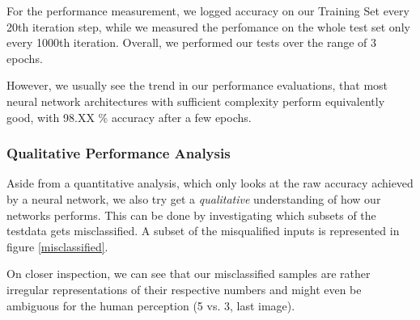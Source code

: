 \documentclass{article}
\begin{document}
For the performance measurement, we logged accuracy on our Training Set every 20th iteration step, while we measured the perfomance on the whole test set only every 1000th iteration. Overall, we performed our tests over the range of 3 epochs. 

However, we usually see the trend in our performance evaluations, that most neural network architectures with sufficient complexity perform equivalently good, with 98.XX \% accuracy after a few epochs.

\subsubsection{Qualitative Performance Analysis}

Aside from a quantitative analysis, which only looks at the raw accuracy achieved by a neural network, we also try get a \textit{qualitative} understanding of how our networks performs. This can be done by investigating which subsets of the testdata gets misclassified. A subset of the misqualified inputs is represented in figure \ref{misclassified}.

On closer inspection, we can see that our misclassified samples are rather irregular representations of their respective numbers and might even be ambiguous for the human perception (5 vs. 3, last image).
\end{document}
